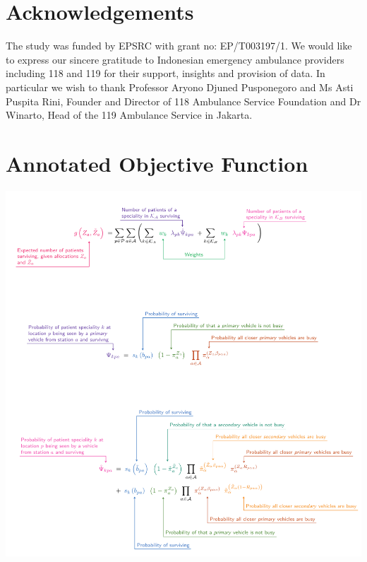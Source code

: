 \documentclass[preprint,12pt]{elsarticle}
\begin{document}



\section*{Acknowledgements}
The study was funded by EPSRC with grant no: EP/T003197/1. We would like to
express our sincere gratitude to Indonesian emergency ambulance providers
including 118 and 119 for their support, insights and provision of data. In
particular we wish to thank Professor Aryono Djuned Pusponegoro and Ms Asti
Puspita Rini, Founder and Director of 118 Ambulance Service Foundation and Dr
Winarto, Head of the 119 Ambulance Service in Jakarta.


\appendix

\section{Annotated Objective Function}\label{apx:annotated}
\includegraphics[width=\textwidth]{img/annotate}
\end{document}
